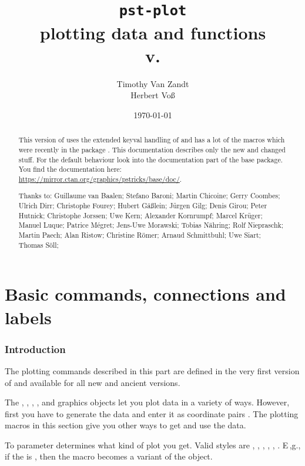 \documentclass[11pt,english,BCOR=10mm,DIV=12,bibliography=totoc,parskip=false,headings=small,
    headinclude=false,footinclude=false,twoside]{pst-doc}
\let\pstFV\fileversion
\begin{document}
\title{\texttt{pst-plot}\\plotting data and functions \\\small v.\pstFV}
\author{Timothy Van Zandt\\Herbert Vo\ss}
\date{\today}

\settitle


\begin{abstract}
This version of  uses the extended keyval handling
of  and has a lot of the macros which were recently in
the package . This documentation describes only the
new and changed stuff. For the default behaviour look into the
documentation part of the base  package. You find the
documentation here: \url{https://mirror.ctan.org/graphics/pstricks/base/doc/}.

\vfill
\noindent
Thanks to:  
Guillaume van Baalen;
Stefano Baroni;
Martin Chicoine;
Gerry Coombes;
Ulrich Dirr;
Christophe Fourey;
Hubert Gäßlein;
Jürgen Gilg;
Denis Girou;
Peter Hutnick;
Christophe Jorssen;
Uwe Kern;
Alexander Kornrumpf;
Marcel Krüger;
Manuel Luque;
Patrice Mégret;
Jens-Uwe Morawski;
Tobias Nähring;
Rolf Niepraschk;
Martin Paech;
Alan Ristow;
Christine Römer;
Arnaud Schmittbuhl;
Uwe Siart;
Thomas Söll;
\end{abstract}

\clearpage
\tableofcontents

\clearpage
\part{Basic commands, connections and labels}
\section{Introduction}
The plotting commands described in this part are defined in the very first version
of  and available for all new and ancient versions.

The , , , ,  and
 graphics objects let you plot data in a variety of ways. However,
first you have to generate the data and enter it as coordinate pairs \CAny.
The plotting macros in this section give you other ways to get and use the
data. %




To parameter
determines what kind of plot you get. Valid styles are , ,
, , , . E\,,g., if the  is
, then the macro becomes a variant of the  object.
\end{document}
